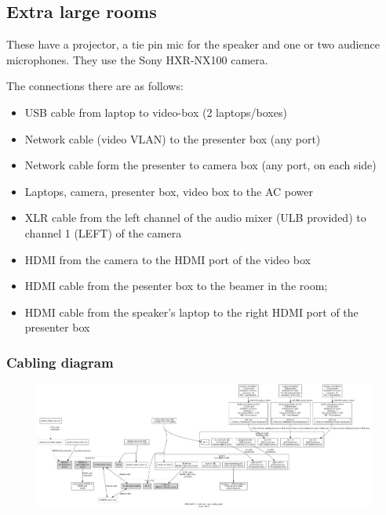\documentclass{article}
\begin{document}
\subsection{Extra large rooms}
These have a projector, a tie pin mic for the speaker and one or two audience microphones. They use the Sony HXR-NX100 camera. 

The connections there are as follows:

\begin{itemize}
  \item USB cable from laptop to video-box (2 laptops/boxes)
  \item Network cable (video VLAN) to the presenter box (any port)
  \item Network cable form the presenter to camera box (any port, on each side)
  \item Laptops, camera, presenter box, video box to the AC power
  \item XLR cable from the left channel of the audio mixer (ULB provided) to channel 1 (LEFT) of the camera
  \item HDMI from the camera to the HDMI port of the video box
  \item HDMI cable from the pesenter box to the beamer in the room;
  \item HDMI cable from the speaker's laptop to the right HDMI port of the presenter box
\end{itemize}

\subsubsection{Cabling diagram}
\begin{figure}[H]
  \begin{sideways}
  \centering
  \includegraphics[width = 200mm]{../../graph/cabling_xxl_rooms.png}
  \end{sideways}
\end{figure}
\end{document}
